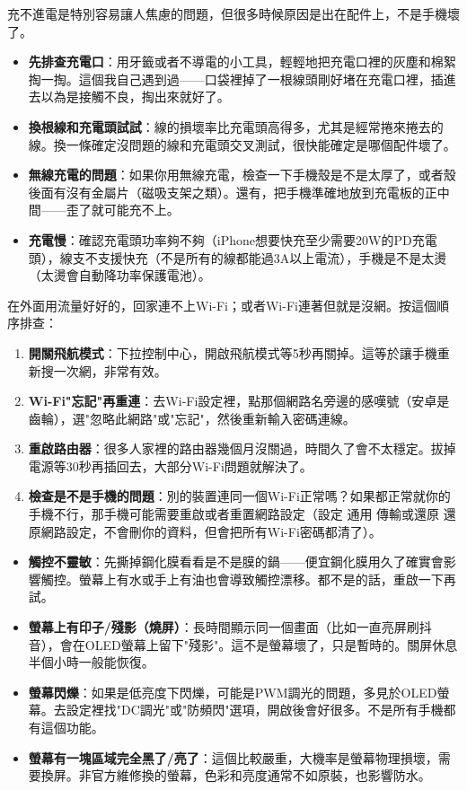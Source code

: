 
充不進電是特別容易讓人焦慮的問題，但很多時候原因是出在配件上，不是手機壞了。

\begin{itemize}
  \item \textbf{先排查充電口}：用牙籤或者不導電的小工具，輕輕地把充電口裡的灰塵和棉絮掏一掏。這個我自己遇到過——口袋裡掉了一根線頭剛好堵在充電口裡，插進去以為是接觸不良，掏出來就好了。
  \item \textbf{換根線和充電頭試試}：線的損壞率比充電頭高得多，尤其是經常捲來捲去的線。換一條確定沒問題的線和充電頭交叉測試，很快能確定是哪個配件壞了。
  \item \textbf{無線充電的問題}：如果你用無線充電，檢查一下手機殼是不是太厚了，或者殼後面有沒有金屬片（磁吸支架之類）。還有，把手機準確地放到充電板的正中間——歪了就可能充不上。
  \item \textbf{充電慢}：確認充電頭功率夠不夠（iPhone想要快充至少需要20W的PD充電頭），線支不支援快充（不是所有的線都能過3A以上電流），手機是不是太燙（太燙會自動降功率保護電池）。
\end{itemize}


在外面用流量好好的，回家連不上Wi-Fi；或者Wi-Fi連著但就是沒網。按這個順序排查：

\begin{enumerate}
  \item \textbf{開關飛航模式}：下拉控制中心，開啟飛航模式等5秒再關掉。這等於讓手機重新搜一次網，非常有效。
  \item \textbf{Wi-Fi"忘記"再重連}：去Wi-Fi設定裡，點那個網路名旁邊的感嘆號（安卓是齒輪），選"忽略此網路"或"忘記"，然後重新輸入密碼連線。
  \item \textbf{重啟路由器}：很多人家裡的路由器幾個月沒關過，時間久了會不太穩定。拔掉電源等30秒再插回去，大部分Wi-Fi問題就解決了。
  \item \textbf{檢查是不是手機的問題}：別的裝置連同一個Wi-Fi正常嗎？如果都正常就你的手機不行，那手機可能需要重啟或者重置網路設定（設定 通用 傳輸或還原 還原網路設定，不會刪你的資料，但會把所有Wi-Fi密碼都清了）。
\end{enumerate}


\begin{itemize}
  \item \textbf{觸控不靈敏}：先撕掉鋼化膜看看是不是膜的鍋——便宜鋼化膜用久了確實會影響觸控。螢幕上有水或手上有油也會導致觸控漂移。都不是的話，重啟一下再試。
  \item \textbf{螢幕上有印子/殘影（燒屏）}：長時間顯示同一個畫面（比如一直亮屏刷抖音），會在OLED螢幕上留下"殘影"。這不是螢幕壞了，只是暫時的。關屏休息半個小時一般能恢復。
  \item \textbf{螢幕閃爍}：如果是低亮度下閃爍，可能是PWM調光的問題，多見於OLED螢幕。去設定裡找"DC調光"或"防頻閃"選項，開啟後會好很多。不是所有手機都有這個功能。
  \item \textbf{螢幕有一塊區域完全黑了/亮了}：這個比較嚴重，大機率是螢幕物理損壞，需要換屏。非官方維修換的螢幕，色彩和亮度通常不如原裝，也影響防水。
\end{itemize}

